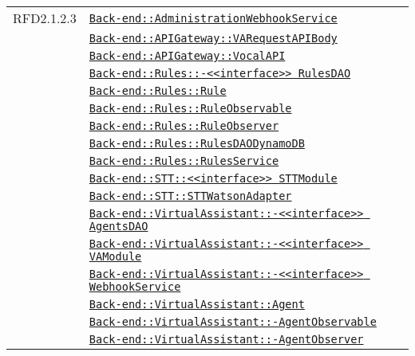 \begin{longtable}{|>{\centering}m{3cm}|m{10cm}<{\centering}|}
RFD2.1.2.3 & \hyperref[Back-end::AdministrationWebhookService]{\texttt{Back-end::AdministrationWebhookService}}\\
& \hyperref[Back-end::APIGateway::VARequestAPIBody]{\texttt{Back-end::APIGateway::VARequestAPIBody}}\\
& \hyperref[Back-end::APIGateway::VocalAPI]{\texttt{Back-end::APIGateway::VocalAPI}}\\
& \hyperref[Back-end::Rules::<<interface>> RulesDAO]{\texttt{Back-end::Rules::-\linebreak <<interface>> RulesDAO}}\\
& \hyperref[Back-end::Rules::Rule]{\texttt{Back-end::Rules::Rule}}\\
& \hyperref[Back-end::Rules::RuleObservable]{\texttt{Back-end::Rules::RuleObservable}}\\
& \hyperref[Back-end::Rules::RuleObserver]{\texttt{Back-end::Rules::RuleObserver}}\\
& \hyperref[Back-end::Rules::RulesDAODynamoDB]{\texttt{Back-end::Rules::RulesDAODynamoDB}}\\
& \hyperref[Back-end::Rules::RulesService]{\texttt{Back-end::Rules::RulesService}}\\
& \hyperref[Back-end::STT::<<interface>> STTModule]{\texttt{Back-end::STT::<<interface>> STTModule}}\\
& \hyperref[Back-end::STT::STTWatsonAdapter]{\texttt{Back-end::STT::STTWatsonAdapter}}\\
& \hyperref[Back-end::VirtualAssistant::<<interface>> AgentsDAO]{\texttt{Back-end::VirtualAssistant::-\linebreak <<interface>> AgentsDAO}}\\
& \hyperref[Back-end::VirtualAssistant::<<interface>> VAModule]{\texttt{Back-end::VirtualAssistant::-\linebreak <<interface>> VAModule}}\\
& \hyperref[Back-end::VirtualAssistant::<<interface>> WebhookService]{\texttt{Back-end::VirtualAssistant::-\linebreak <<interface>> WebhookService}}\\
& \hyperref[Back-end::VirtualAssistant::Agent]{\texttt{Back-end::VirtualAssistant::Agent}}\\
& \hyperref[Back-end::VirtualAssistant::AgentObservable]{\texttt{Back-end::VirtualAssistant::-\linebreak AgentObservable}}\\
& \hyperref[Back-end::VirtualAssistant::AgentObserver]{\texttt{Back-end::VirtualAssistant::-\linebreak AgentObserver}}\\

\end{longtable}

